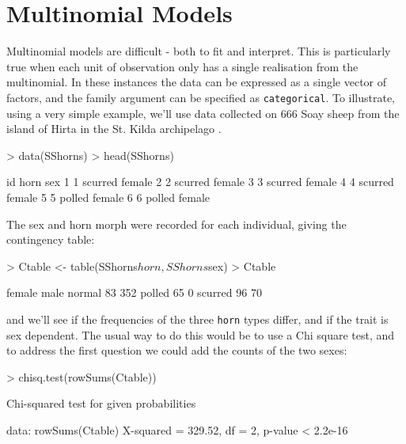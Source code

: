 \documentclass{article}
\begin{document}
\section{Multinomial Models}

Multinomial models are difficult - both to fit and interpret.  This is particularly true when each unit of observation only has a single realisation from the multinomial. In these instances the data can be expressed as a single vector of factors, and the family argument can be specified as \texttt{categorical}.  To illustrate, using a very simple example, we'll use data collected on 666 Soay sheep from the island of Hirta in the St. Kilda archipelago \citep[][Table A2.5]{Clutton-Brock.2004}. 


\begin{Schunk}
\begin{Sinput}
> data(SShorns)
> head(SShorns)
\end{Sinput}
\begin{Soutput}
  id    horn    sex
1  1 scurred female
2  2 scurred female
3  3 scurred female
4  4 scurred female
5  5  polled female
6  6  polled female
\end{Soutput}
\end{Schunk}

The sex and horn morph were recorded for each individual, giving the contingency table:  

\begin{Schunk}
\begin{Sinput}
> Ctable <- table(SShorns$horn, SShorns$sex)
> Ctable
\end{Sinput}
\begin{Soutput}
          female male
  normal      83  352
  polled      65    0
  scurred     96   70
\end{Soutput}
\end{Schunk}

and we'll see if the frequencies of the three \texttt{horn} types differ, and if the trait is sex dependent. The usual way to do this would be to use a Chi square test, and to address the first question we could add the counts of the two sexes: 

\begin{Schunk}
\begin{Sinput}
> chisq.test(rowSums(Ctable))
\end{Sinput}
\begin{Soutput}
	Chi-squared test for given probabilities

data:  rowSums(Ctable)
X-squared = 329.52, df = 2, p-value < 2.2e-16
\end{Soutput}
\end{Schunk}
\end{document}
